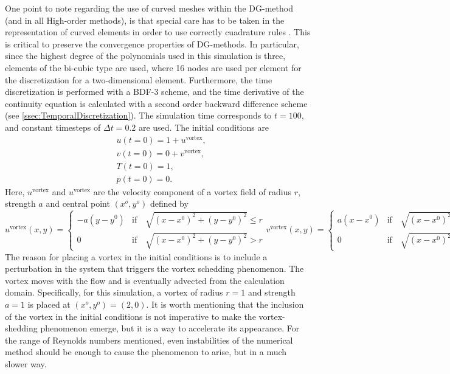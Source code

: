 One point to note regarding the use of curved meshes within the DG-method (and in all High-order methods), is that special care has to be taken in the representation of curved elements in order to use correctly cuadrature rules \citep{bassiHighOrderAccurateDiscontinuous1997}. This is critical to preserve the convergence properties of DG-methods. In particular, since the highest degree of the polynomials used in this simulation is three, elements of the bi-cubic type are used, where 16 nodes are used per element for the discretization for a two-dimensional element. Furthermore, the time discretization is performed with a BDF-3 scheme, and the time derivative of the continuity equation is calculated with a second order backward difference scheme (see \cref{ssec:TemporalDiscretization}). The simulation time corresponds to $t= 100$, and constant timesteps of $\Delta t = 0.2$ are used. The initial conditions are
\begin{subequations} 
\begin{align}
&u(t=0) = 1 + u^{\text{vortex}},  \\
&v(t=0) = 0 + v^{\text{vortex}},  \\
&T(t=0) = 1,\\
&p(t=0) = 0.
\end{align}
\end{subequations}
Here, $u^{\text{vortex}}$ and $u^{\text{vortex}}$ are the velocity component of a vortex field of radius $r$, strength $a$  and central point $(x^o,y^o)$ defined by 
{
\begin{subequations}
\begin{equation}
	u^{\text{vortex}}(x,y) = 
	\begin{cases}
		-a(y-y^0) & \text{if} \quad\sqrt{(x-x^0)^2+(y-y^0)^2} \leq r \\
		0 & \text{if} \quad\sqrt{(x-x^0)^2+(y-y^0)^2} > r
	\end{cases}
\end{equation}\label{eq:VortexU}
\begin{equation}
	v^{\text{vortex}}(x,y) = 
	\begin{cases}
		a(x-x^0) & \text{if} \quad\sqrt{(x-x^0)^2+(y-y^0)^2} \leq r \\
		0 & \text{if} \quad\sqrt{(x-x^0)^2+(y-y^0)^2} > r
	\end{cases}
\end{equation}	\label{eq:VortexV}
\end{subequations}
}%
The reason for placing a vortex in the initial conditions is to include a perturbation in the system that triggers the vortex schedding phenomenon. The vortex moves with the flow and is eventually advected from the calculation domain. Specifically, for this simulation, a vortex of radius $r=1$ and strength $a = 1$ is placed at $(x^o,y^o) = ( 2,0)$. It is worth mentioning that the inclusion of the vortex in the initial conditions is not imperative to make the vortex-shedding phenomenon emerge, but it is a way to accelerate its appearance. For the range of Reynolds numbers mentioned, even instabilities of the numerical method should be enough to cause the phenomenon to arise, but in a much slower way. 

